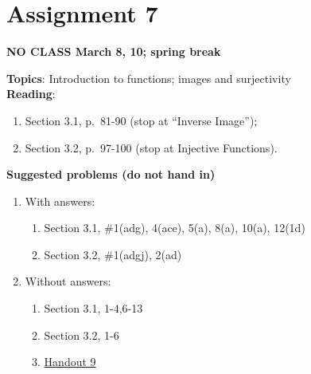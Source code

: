 \documentclass[12pt]{article}
\begin{document}




\newpage
\section[7 (due March 22): Introduction to functions; images and surjectivity.]{Assignment 7}

\textbf{NO CLASS March 8, 10; spring break}

\textbf{Topics}: Introduction to functions; images and surjectivity
\\

\noindent \textbf{Reading}:
\begin{enumerate}
\item Section 3.1, p.~81-90 (stop at ``Inverse Image'');
\item Section 3.2, p.~97-100 (stop at Injective Functions).
\end{enumerate}




\noindent \textbf{Suggested problems (do not hand in)}

\begin{enumerate}
\item With answers:
  \begin{enumerate}
\item Section 3.1, \#1(adg), 4(ace), 5(a), 8(a), 10(a), 12(1d)
\item Section 3.2, \#1(adgj), 2(ad)
\end{enumerate}  
\item Without answers:
  \begin{enumerate}
\item Section 3.1, 1-4,6-13
\item Section 3.2, 1-6
\item \href{https://www.math.emory.edu/~dzb/teaching/250Fall2021/handouts/250-H09-images.pdf}{Handout 9}
  \end{enumerate}    
\end{enumerate}
\end{document}
